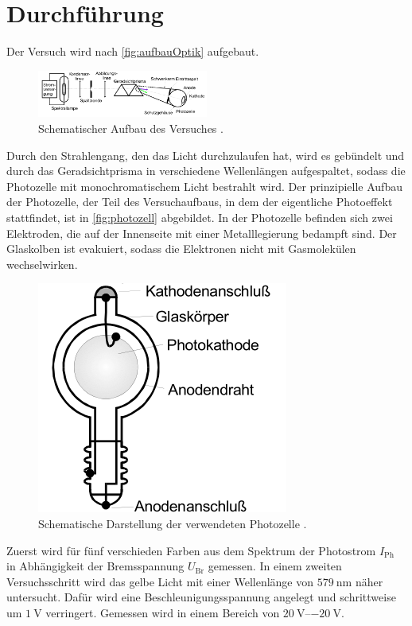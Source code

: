 \section{Durchführung}
\label{sec:Durchführung}

Der Versuch wird nach \autoref{fig:aufbauOptik} aufgebaut.
\begin{figure}[H]
    \centering
    \includegraphics[width = 0.5\textwidth]{data/optischerTeil.png}
    \caption{Schematischer Aufbau des Versuches \cite{Anleitung500}.}
    \label{fig:aufbauOptik}
\end{figure}

\noindent
Durch den Strahlengang, den das Licht durchzulaufen hat, wird es gebündelt und durch das Geradsichtprisma in verschiedene Wellenlängen aufgespaltet, sodass
die Photozelle mit monochromatischem Licht bestrahlt wird. Der prinzipielle Aufbau der Photozelle, der Teil des Versuchaufbaus, in dem der eigentliche Photoeffekt
stattfindet, ist in \autoref{fig:photozell} abgebildet. In der Photozelle befinden sich zwei Elektroden, die auf der Innenseite 
mit einer Metalllegierung bedampft sind. Der Glaskolben ist evakuiert, sodass die Elektronen nicht mit Gasmolekülen wechselwirken.
\begin{figure}[H]
    \centering
    \includegraphics{data/photozelle.png}
    \caption{Schematische Darstellung der verwendeten Photozelle \cite{Anleitung500}.}
    \label{fig:photozell}
\end{figure}

\noindent
Zuerst wird für fünf verschieden Farben aus dem Spektrum der Photostrom $I_{\text{Ph}}$ in Abhängigkeit der Bremsspannung $U_{\text{Br}}$ gemessen.
In einem zweiten Versuchsschritt wird das gelbe Licht mit einer Wellenlänge von $\SI{579}{\nano\metre}$ näher untersucht. Dafür wird eine Beschleunigungsspannung
angelegt und schrittweise um $\SI{1}{\volt}$ verringert. Gemessen wird in einem Bereich von $\SIrange{20}{-20}{\volt}$.